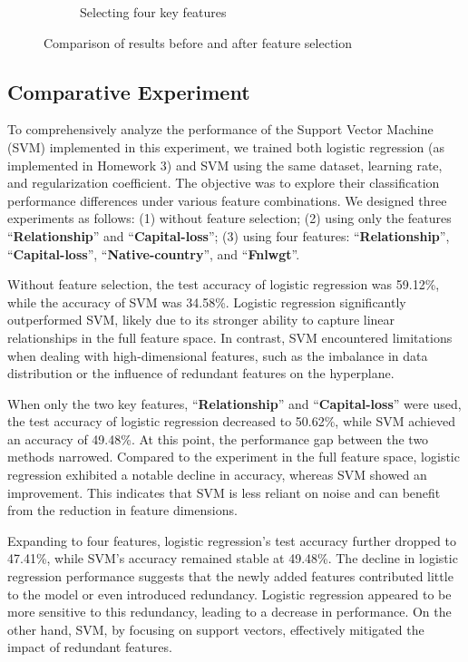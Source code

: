 \documentclass[a4paper, utf8]{ctexart}
\begin{document}
\begin{figure}[htbp]
\begin{subfigure}{.32\textwidth}
			\caption{Selecting four key features}
		\end{subfigure}
		\caption{Comparison of results before and after feature selection}
	\end{figure}
	
	\subsection{Comparative Experiment}
	
	To comprehensively analyze the performance of the Support Vector Machine (SVM) implemented in this experiment, we trained both logistic regression (as implemented in Homework 3) and SVM using the same dataset, learning rate, and regularization coefficient. The objective was to explore their classification performance differences under various feature combinations. We designed three experiments as follows: (1) without feature selection; (2) using only the features ``\textbf{Relationship}'' and ``\textbf{Capital-loss}''; (3) using four features: ``\textbf{Relationship}'', ``\textbf{Capital-loss}'', ``\textbf{Native-country}'', and ``\textbf{Fnlwgt}''.
	
	Without feature selection, the test accuracy of logistic regression was 59.12\%, while the accuracy of SVM was 34.58\%. Logistic regression significantly outperformed SVM, likely due to its stronger ability to capture linear relationships in the full feature space. In contrast, SVM encountered limitations when dealing with high-dimensional features, such as the imbalance in data distribution or the influence of redundant features on the hyperplane.
	
	When only the two key features, ``\textbf{Relationship}'' and ``\textbf{Capital-loss}'' were used, the test accuracy of logistic regression decreased to 50.62\%, while SVM achieved an accuracy of 49.48\%. At this point, the performance gap between the two methods narrowed. Compared to the experiment in the full feature space, logistic regression exhibited a notable decline in accuracy, whereas SVM showed an improvement. This indicates that SVM is less reliant on noise and can benefit from the reduction in feature dimensions.
	
	Expanding to four features, logistic regression's test accuracy further dropped to 47.41\%, while SVM's accuracy remained stable at 49.48\%. The decline in logistic regression performance suggests that the newly added features contributed little to the model or even introduced redundancy. Logistic regression appeared to be more sensitive to this redundancy, leading to a decrease in performance. On the other hand, SVM, by focusing on support vectors, effectively mitigated the impact of redundant features.
	
\end{document}
